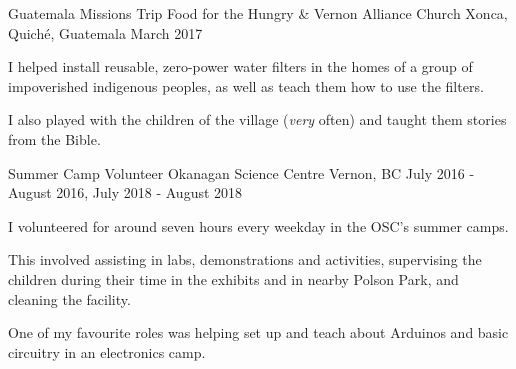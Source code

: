 \begin{cventries}
  \cventry
    {Guatemala Missions Trip} %
    {Food for the Hungry \& Vernon Alliance Church} %
    {Xonca, Quiché, Guatemala} %
    {March 2017} %
    {
      \begin{cvitems} %
        \item{I helped install reusable, zero-power water filters in the homes of a group of impoverished indigenous peoples, as well as teach them how to use the filters.}
        \item{I also played with the children of the village (\textit{very} often) and taught them stories from the Bible.}
      \end{cvitems}
    }

  \cventry
    {Summer Camp Volunteer} %
    {Okanagan Science Centre} %
    {Vernon, BC} %
    {July 2016 - August 2016, July 2018 - August 2018} %
    {
      \begin{cvitems} %
        \item{I volunteered for around seven hours every weekday in the OSC's summer camps.}
        \item{This involved assisting in labs, demonstrations and activities, supervising the children during their time in the exhibits and in nearby Polson Park, and cleaning the facility.}
        \item{One of my favourite roles was helping set up and teach about Arduinos and basic circuitry in an electronics camp.}
      \end{cvitems}
    }

\end{cventries}
